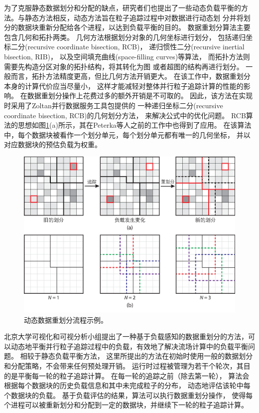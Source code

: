 为了克服静态数据划分和分配的缺点，研究者们也提出了一些动态负载平衡的方 法。与静态方法相反，动态方法旨在粒子追踪过程中对数据进行动态划 分并将划分的数据块重新分配给各个进程，以达到负载平衡的目的。
数据重划分算法主要包含几何和拓扑两类。
几何方法根据划分对象的几何坐标进行划分，
包括递归坐标二分(recursive coordinate bisection, RCB)\parencite{BergerB87}，
递归惯性二分(recursive inertial bisection, RIB)\parencite{Simon91}，
以及空间填充曲线(space-filling curves)\parencite{PilkingtonB94}等算法，
而拓扑方法则需要先构造分区对象的拓扑结构，将其转化为图\parencite{GeorgeV96}
或者超图\parencite{CatalyurekBDBHR07}的结构再进行划分。
一般而言，拓扑方法精度更高，但比几何方法开销更大。
在该工作中，数据重划分本身的计算代价应当尽量小，
这样才能减轻对整体并行粒子追踪计算的性能的影响。
在数据重划分操作上花费过多的额外开销是不可取的。
因此，该方法在实现时采用了Zoltan并行数据服务工具包\parencite{DevineBHHV02}提供的
一种递归坐标二分(recursive coordinate bisection, RCB)的几何划分方法\parencite{BergerB87}，
来解决公式中的优化问题。
RCB算法的思想如图\ref{fig:dynamicdr:repartition}(a)所示，其在Peterka等人之前的工作\parencite{PeterkaRNLSKH11}中也得到了应用。
在该算法中，每个数据块被看作一个划分单元，每个划分单元都有唯一的几何坐标，
并以对应数据块的预估负载为权重。

\begin{figure}[!tb]
  \centering
  \includegraphics[width=.85\linewidth]{image/loadbalance/repartition.eps}
  \caption{
    动态数据重划分流程示例\parencite{ZhangGYP18}。
  }
  \label{fig:dynamicdr:repartition}
\end{figure}

北京大学可视化和可视分析小组提出了一种基于负载感知的数据重划分的方法\parencite{ZhangGYP18}，可以动态地平衡并行粒子追踪过程中的负载，有效地了解决流场计算中的负载平衡问题。
相较于静态负载平衡方法，
这里所提出的方法在初始时使用一般的数据划分和分配策略，不会带来任何预处理开销。
运行时过程被管理为若干个轮次，其目的是平衡每一轮的粒子追踪计算。
在每一轮的追踪之前（除去第一轮），
算法会根据每个数据块的历史负载信息和其中未完成粒子的分布，
动态地评估该轮中每个数据块的负载。
基于负载评估的结果，算法可以执行数据重划分操作，
使得每个进程可以被重新划分和分配到一定的数据块，并继续下一轮的粒子追踪计算。

